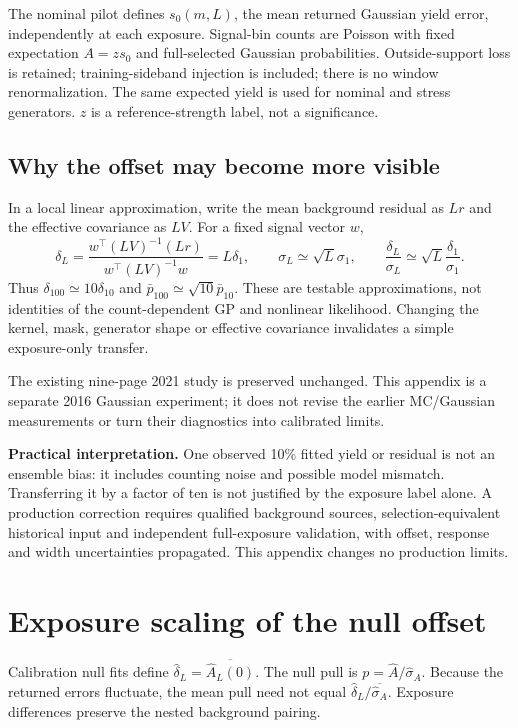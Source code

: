 \documentclass[10pt]{article}
\newcommand{\Ah}{\widehat A}\newcommand{\sh}{\widehat\sigma}
\begin{document}
The nominal pilot defines $s_0(m,L)$, the mean returned Gaussian yield error, independently at each exposure. Signal-bin counts are Poisson with fixed expectation $A=z s_0$ and full-selected Gaussian probabilities. Outside-support loss is retained; training-sideband injection is included; there is no window renormalization. The same expected yield is used for nominal and stress generators. $z$ is a reference-strength label, not a significance.

\subsection*{Why the offset may become more visible}

In a local linear approximation, write the mean background residual as $Lr$ and the effective covariance as $LV$. For a fixed signal vector $w$,\[\delta_L=\frac{w^\top(LV)^{-1}(Lr)}{w^\top(LV)^{-1}w}=L\delta_1,\qquad\sigma_L\simeq\sqrt{L}\sigma_1,\qquad\frac{\delta_L}{\sigma_L}\simeq\sqrt L\frac{\delta_1}{\sigma_1}.\]Thus $\delta_{100}\simeq10\delta_{10}$ and $\bar p_{100}\simeq\sqrt{10}\bar p_{10}$. These are testable approximations, not identities of the count-dependent GP and nonlinear likelihood. Changing the kernel, mask, generator shape or effective covariance invalidates a simple exposure-only transfer.

The existing nine-page 2021 study is preserved unchanged. This appendix is a separate 2016 Gaussian experiment; it does not revise the earlier MC/Gaussian measurements or turn their diagnostics into calibrated limits.

\textbf{Practical interpretation.} One observed 10\% fitted yield or residual is not an ensemble bias: it includes counting noise and possible model mismatch. Transferring it by a factor of ten is not justified by the exposure label alone. A production correction requires qualified background sources, selection-equivalent historical input and independent full-exposure validation, with offset, response and width uncertainties propagated. This appendix changes no production limits.

\clearpage\section*{Exposure scaling of the null offset}


Calibration null fits define $\widehat\delta_L=\overline{\Ah_L(0)}$. The null pull is $p=\Ah/\sh_A$. Because the returned errors fluctuate, the mean pull need not equal $\widehat\delta_L/\overline{\sh_A}$. Exposure differences preserve the nested background pairing.
\end{document}
